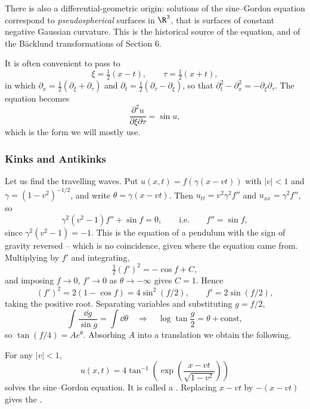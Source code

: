 There is also a differential-geometric origin: solutions of the sine--Gordon equation correspond to \emph{pseudospherical} surfaces in $\R^3$, that is surfaces of constant negative Gaussian curvature. This is the historical source of the equation, and of the B\"acklund transformations of Section 6.

It is often convenient to pass to 
$$
\xi = \tfrac{1}{2}(x - t), \qquad \tau = \tfrac{1}{2}(x+t),
$$
in which $\partial_x = \frac{1}{2}(\partial_\xi + \partial_\tau)$ and $\partial_t = \frac{1}{2}(\partial_\tau - \partial_\xi)$, so that $\partial_t^2 - \partial_x^2 = -\partial_\xi\partial_\tau$. The equation becomes
$$
\frac{\partial^2u}{\partial\xi\partial\tau} = \sin u,
$$
which is the form we will mostly use.

\subsubsection{Kinks and Antikinks}

Let us find the travelling waves. Put $u(x,t) = f(\gamma(x - vt))$ with $|v|<1$ and $\gamma = (1-v^2)^{-1/2}$, and write $\theta = \gamma(x-vt)$. Then $u_{tt} = v^2\gamma^2f''$ and $u_{xx} = \gamma^2f''$, so
$$
\gamma^2(v^2-1)f'' + \sin f = 0, \qquad\text{i.e.}\qquad f'' = \sin f,
$$
since $\gamma^2(v^2-1) = -1$. This is the equation of a pendulum with the sign of gravity reversed -- which is no coincidence, given where the equation came from. Multiplying by $f'$ and integrating,
$$
\tfrac{1}{2}(f')^2 = -\cos f + C,
$$
and imposing $f\to0$, $f'\to0$ as $\theta\to-\infty$ gives $C = 1$. Hence
$$
(f')^2 = 2(1-\cos f) = 4\sin^2(f/2), \qquad f' = 2\sin(f/2),
$$
taking the positive root. Separating variables and substituting $g = f/2$,
$$
\int\frac{\dd g}{\sin g} = \int\dd\theta \quad\Longrightarrow\quad \log\tan\frac{g}{2} = \theta + \text{const},
$$
so $\tan(f/4) = Ae^{\theta}$. Absorbing $A$ into a translation we obtain the following.

\begin{proposition}
	For any $|v|<1$,
	$$
	u(x,t) = 4\tan^{-1}\left(\exp\left(\frac{x - vt}{\sqrt{1-v^2}}\right)\right)
	$$
	solves the sine--Gordon equation. It is called a . Replacing $x - vt$ by $-(x-vt)$ gives the .
\end{proposition}

